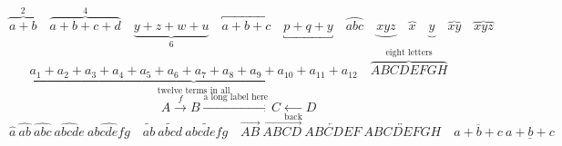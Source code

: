 \documentclass[11pt]{article}
\begin{document}
\[ \overbrace{a+b}^{2}\quad \overbrace{a+b+c+d}^{4}\quad \underbrace{y+z+w+u}_{6}\quad \overbracket{a+b+c}\quad \underbracket{p+q+y}\quad
   \overparen{abc}\quad \underparen{xyz}\quad \overbrace{x}\quad \underbrace{y}\quad \overbrace{xy}\quad \overbrace{xyz} \]
\[ \underbrace{a_1+a_2+a_3+a_4+a_5+a_6+a_7+a_8+a_9+a_{10}+a_{11}+a_{12}}_{\text{twelve terms in all}}\quad
   \overbrace{ABCDEFGH}^{\text{eight letters}} \]
\[ A\xrightarrow{f}B\xrightarrow{\text{a long label here}}C\xleftarrow[\text{back}]{}D \]
\[ \widehat{a}\ \widehat{ab}\ \widehat{abc}\ \widehat{abcde}\ \widehat{abcdefg}\quad \widetilde{ab}\ \widetilde{abcd}\ \widetilde{abcdefg}\quad
   \overrightarrow{AB}\ \overrightarrow{ABCD}\ \overleftarrow{ABCDEF}\ \overleftrightarrow{ABCDEFGH}\quad \overline{a+b+c}\ \underline{a+b+c} \]
\end{document}
